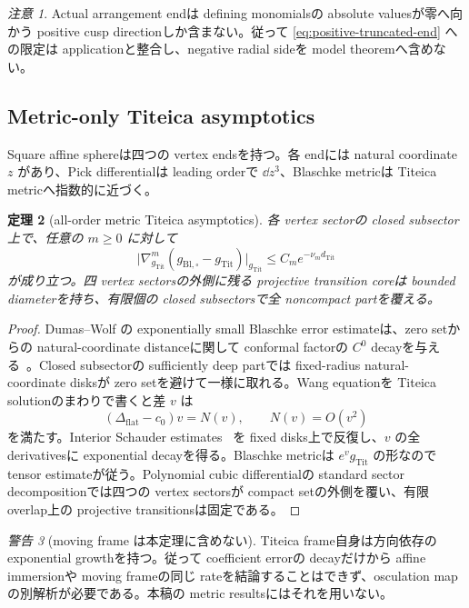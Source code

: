 \documentclass[11pt,a4paper]{ltjsarticle}
\theoremstyle{plain}
\newtheorem{theorem}{定理}[section]\newtheorem{proposition}[theorem]{命題}
\theoremstyle{definition}
\theoremstyle{remark}
\newtheorem{remark}[theorem]{注意}\newtheorem{warning}[theorem]{警告}
\begin{document}
\begin{remark}
Actual arrangement endは defining monomialsの absolute valuesが零へ向かう positive cusp directionしか含まない。従って \cref{eq:positive-truncated-end} への限定は applicationと整合し、negative radial sideを model theoremへ含めない。
\end{remark}

\subsection{Metric-only Titeica asymptotics}
Square affine sphereは四つの vertex endsを持つ。各 endには natural coordinate $z$ があり、Pick differentialは leading orderで $\dd z^3$、Blaschke metricは Titeica metricへ指数的に近づく。

\begin{theorem}[all-order metric Titeica asymptotics]\label{thm:titeica-metric}
各 vertex sectorの closed subsector上で、任意の $m\ge0$ に対して
\[
 \bigl|\nabla^m_{g_{\mathrm{Tit}}}
 (g_{\mathrm{Bl},\square}-g_{\mathrm{Tit}})\bigr|_{g_{\mathrm{Tit}}}
 \le C_m e^{-\nu_m d_{\mathrm{Tit}}}
\]
が成り立つ。四 vertex sectorsの外側に残る projective transition coreは bounded diameterを持ち、有限個の closed subsectorsで全 noncompact partを覆える。
\end{theorem}

\begin{proof}
Dumas--Wolf の exponentially small Blaschke error estimateは、zero setからの natural-coordinate distanceに関して conformal factorの $C^0$ decayを与える~\cite{DW}。Closed subsectorの sufficiently deep partでは fixed-radius natural-coordinate disksが zero setを避けて一様に取れる。Wang equationを Titeica solutionのまわりで書くと差 $v$ は
\[
 (\Delta_{\mathrm{flat}}-c_0)v=N(v),\qquad N(v)=O(v^2)
\]
を満たす。Interior Schauder estimates~\cite{CC} を fixed disks上で反復し、$v$ の全 derivativesに exponential decayを得る。Blaschke metricは $e^vg_{\mathrm{Tit}}$ の形なので tensor estimateが従う。Polynomial cubic differentialの standard sector decompositionでは四つの vertex sectorsが compact setの外側を覆い、有限 overlap上の projective transitionsは固定である。
\end{proof}

\begin{warning}[moving frame は本定理に含めない]
Titeica frame自身は方向依存の exponential growthを持つ。従って coefficient errorの decayだけから affine immersionや moving frameの同じ rateを結論することはできず、osculation mapの別解析が必要である。本稿の metric resultsにはそれを用いない。
\end{warning}
\end{document}
